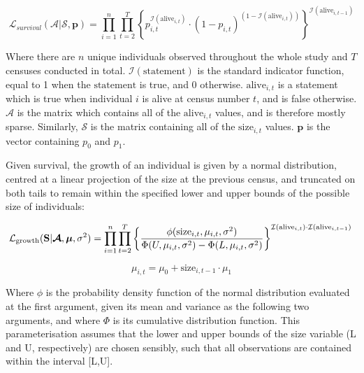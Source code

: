 \documentclass[a4paper,12pt]{article}
\begin{document}
\begin{equation}
    \mathcal{L}_{survival}(\boldsymbol{\mathcal{A}}|\boldsymbol{\mathcal{S}}, \boldsymbol{p}) = \prod_{i=1}^n\prod_{t=2}^T \left\{p_{i,t}^{\mathcal{I}(\text{alive}_{i, t})} \cdot (1-p_{i,t})^{\left(1-\mathcal{I}(\text{alive}_{i, t})\right)}\right\}^{\mathcal{I}(\text{alive}_{i, t-1})}
\end{equation}

Where there are $n$ unique individuals observed throughout the whole study and $T$ censuses conducted in total. $\mathcal{I}(\text{statement})$ is the standard indicator function, equal to 1 when the $\text{statement}$ is true, and 0 otherwise. $\text{alive}_{i, t}$ is a statement which is true when individual $i$ is alive at census number $t$, and is false otherwise. $\boldsymbol{\mathcal{A}}$ is the matrix which contains all of the $\text{alive}_{i, t}$ values, and is therefore mostly sparse. Similarly, $\boldsymbol{\mathcal{S}}$ is the matrix containing all of the $\text{size}_{i,t}$ values. $\boldsymbol{p}$ is the vector containing $p_0$ and $p_1$.

Given survival, the growth of an individual is given by a normal distribution, centred at a linear projection of the size at the previous census, and truncated on both tails to remain within the specified lower and upper bounds of the possible size of individuals:

\begin{equation}
            \mathcal{L}_{\text{growth}}(\textbf{S} |\boldsymbol{\mathcal{A}}, \boldsymbol{\mu}, \sigma^2) = \prod_{i=1}^n \prod_{t=2}^T \left\{\frac{\phi(\text{size}_{i, t}, \mu_{i,t}, \sigma^2)}{\Phi(U,\mu_{i, t},\sigma^2)-\Phi(L,\mu_{i, t},\sigma^2)}\right\}^{\mathcal{I}(\text{alive}_{i, t}) \cdot \mathcal{I}(\text{alive}_{i, t-1})} \\
\end{equation}

\begin{equation}
    \mu_{i, t} = \mu_0 + \text{size}_{i, t-1} \cdot \mu_1
\end{equation}

Where $\phi$ is the probability density function of the normal distribution evaluated at the first argument, given its mean and variance as the following two arguments, and where $\Phi$ is its cumulative distribution function. This parameterisation assumes that the lower and upper bounds of the size variable (L and U, respectively) are chosen sensibly, such that all observations are contained within the interval [L,U].
\end{document}
